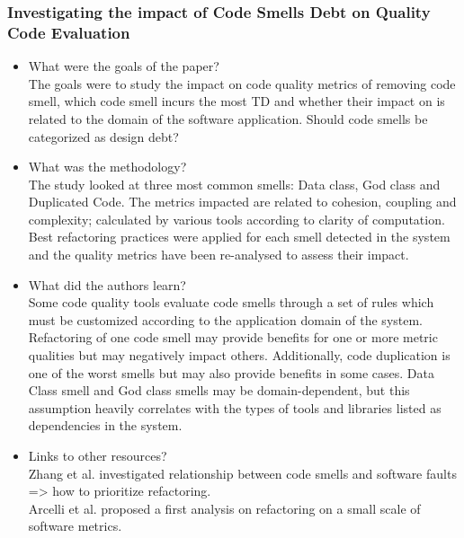 \documentclass{mprop}
\begin{document}
\subsubsection{Investigating the impact of Code Smells Debt on Quality Code
Evaluation} \cite{Fontana2012}
\begin{itemize}
	\item What were the goals of the paper? \\
	      The goals were to study the impact on code quality metrics of
	      removing code smell, which code smell incurs the most TD and whether
	      their impact on is related to the domain of the software
	      application. Should code smells be categorized as design debt?
	\item What was the methodology? \\
	      The study looked at three most common smells: Data class, God class
	      and Duplicated Code. The metrics impacted are related to cohesion,
	      coupling and complexity; calculated by various tools according to
	      clarity of computation. Best refactoring practices were applied for
	      each smell detected in the system and the quality metrics have been
	      re-analysed to assess their impact.
	\item What did the authors learn? \\
	      Some code quality tools evaluate code smells through a set of rules
	      which must be customized according to the application domain of the
	      system. Refactoring of one code smell may provide benefits for one
	      or more metric qualities but may negatively impact others.
	      Additionally, code duplication is one of the worst smells but may
	      also provide benefits in some cases. Data Class smell and God class
	      smells may be domain-dependent, but this assumption heavily
	      correlates with the types of tools and libraries listed as
	      dependencies in the system.
	\item Links to other resources? \\
	      Zhang et al. investigated relationship between code smells and
	      software faults => how to prioritize refactoring.\\
	      Arcelli et al. proposed a first analysis on refactoring on a small
	      scale of software metrics.
\end{itemize}
\end{document}
